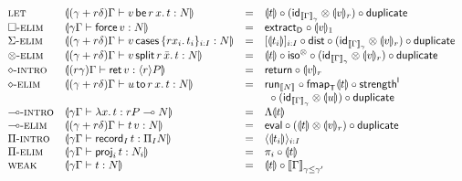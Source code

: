 \documentclass[acmsmall,review,anonymous]{acmart}\settopmatter{printfolios=true,printccs=false,printacmref=false}
\begin{document}
\[
\begin{array}{llcl}
\rlet %
  & \dent {\pCompTy {\gamma + r\delta} \Gamma {\qlet r x v t} {N}}
  & = & \dent t
  \comp (\tid[\Den \Gamma \gamma] \otimes \denv v r)
  \comp \duplicate
\\
\relim\Box
  & \dent {\qCompTy \gamma \Gamma {\force v} {N}}
  & = & \extract[\D] \comp \denv v 1
\\
\relim\GS
  & \dent {\pCompTy {\gamma + r\delta} \Gamma {\caser v \{r x_i.\, t_i\}_{i:I}} {N}}
  & = & [\dent {t_i}]_{i:I} \comp \tdist
  \comp (\tid[\Den \Gamma \gamma] \otimes \denv v r)
  \comp \duplicate
\\
\relim\otimes
  & \dent {\pCompTy {\gamma + r\delta} \Gamma {\qsplits r v {\bar x} t} {N}}
  & = & \dent t \comp \isot
  \comp (\tid[\Den \Gamma \gamma] \otimes \denv v r)
  \comp \duplicate
\\
\rintro\diamond
  & \dent {\pCompTy {r\gamma} \Gamma {\ret v} {\compty r P}}
  & = & \treturn \comp \denv v r
\\
\relim\diamond
  & \dent {\pCompTy {\gamma + r\delta} \Gamma {\qbind r x u t} {N}}
  & = & \run[\den N] \comp \fmapt[\T]{\dent t} \comp \strengthl
\\ &&& {~}
  \comp (\tid[\Den \Gamma \gamma] \otimes \dent u)
  \comp \duplicate
\\
\rintro\lolli
  & \dent {\qCompTy \gamma \Gamma {\lam x t} {\qfun r P N}}
  & = & \Lambda \dent t
\\
\relim\lolli
  & \dent{\pCompTy {\gamma + r\delta} \Gamma {\app t v} N}
  & = & \teval \comp (\dent t \otimes \denv v r) \comp \duplicate
\\
\rintro\Pi
  & \dent {\qCompTy \gamma \Gamma {\recrd I t} {\rect I N}}
  & = & \langle \dent {t_i} \rangle_{i:I}
\\
\relim\Pi
  & \dent {\qCompTy \gamma \Gamma {\proj i t} {N_i}}
  & = & \pi_i \comp \dent t
\\
\rweak
  & \dent {\qCompTy \gamma \Gamma t N}
  & = & \dent t \comp \Den \Gamma {\gamma \leq \gamma'}
\\
\end{array}
\]
\end{document}
